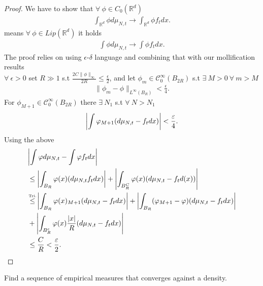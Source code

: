 \begin{proof}
 We have to show that $\forall  \  \phi  \in  C_0(\mathbb{R}^{d} )$  
 \begin{align*}
   \int_{\mathbb{R}^{d} } \phi d\mu_{N,t} \to  \int_{\mathbb{R}^{d} } \phi f_t dx
 .\end{align*}
 means $\forall  \ \phi  \in  Lip(\mathbb{R}^{d} )$ it holds 
 \begin{align*}
   \int \phi d\mu_{N,t} \to  \int \phi f_t dx 
 .\end{align*}
 The proof relies on using $\epsilon$-$\delta $ language and combining that with our mollification results \\[1ex]
 $\forall  \ \epsilon  > 0$ set $R \gg 1$ s.t $\frac{2C\|\phi \|_\infty}{2R}\le \frac{\epsilon}{2}$, and let $\phi_m \in  \mathcal{C}_0^{\infty}(B_{2R}) $ s.t $ \exists \ M>0 \ \forall \ m > M$ 
 \begin{align*}
   \|\phi_m - \phi \|_{L^{\infty}(B_R) } < \frac{\epsilon}{4}
 .\end{align*}
 For $\phi_{M+1} \in  \mathcal{C}_0^{\infty}(B_{2R}) $ there $\exists \ N_1$ s.t $\forall \ N > N_{1}$
 \begin{align*}
   \abs*{\int \phi_{M+1} (d\mu_{N,t}-f_t dx)} < \frac{\epsilon}{4}
 .\end{align*}
 Using the above 
 \begin{align*}
   &\abs*{\int \phi  d\mu_{N,t} - \int \phi  f_t dx}  \\
   &\le \abs*{\int_{B_{R}}\phi(x) (d\mu_{N,t}f_t dx)} + \abs*{\int_{B_{R}^{C} } \phi(x) (d\mu_{N,t} - f_t d(x))}  \\
   &\myS{Tri.}{\le } \abs*{\int_{B_R} \phi(x)_{M+1} (d\mu_{N,t}- f_t dx)}  +  \abs*{\int_{B_R}(\phi_{M+1}-\phi )(d\mu_{N,t}-f_t dx)} \\
   &+ \abs*{\int_{B_{R}^{c} } \phi(x) \frac{\abs{x}}{R}(d\mu_{N,t}-f_t dx)} \\
   &  \le \frac{C}{R} < \frac{\epsilon }{2} 
 .\end{align*}
\end{proof}
\begin{exercise}
  Find a sequence of empirical measures that converges against a density.
\end{exercise}

